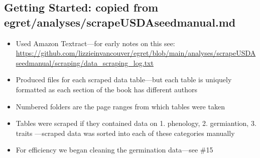 \documentclass{article}[12pt]
\begin{document}
\subsection*{Getting Started: copied from egret/analyses/scrapeUSDAseedmanual.md}
\begin{itemize}
\item Used Amazon Textract---for early notes on this see: \url{https://github.com/lizzieinvancouver/egret/blob/main/analyses/scrapeUSDAseedmanual/scraping/data_scraping_log.txt}
\item Produced files for each scraped data table---but each table is uniquely formatted as each section of the book has different authors
\item Numbered folders are the page ranges from which tables were taken
\item Tables were scraped if they contained data on 1. phenology, 2. germiantion, 3. traits ---scraped data was sorted into each of these categories manually
\item For efficiency we began cleaning the germination data---see \#15
\end{itemize}
\end{document}
